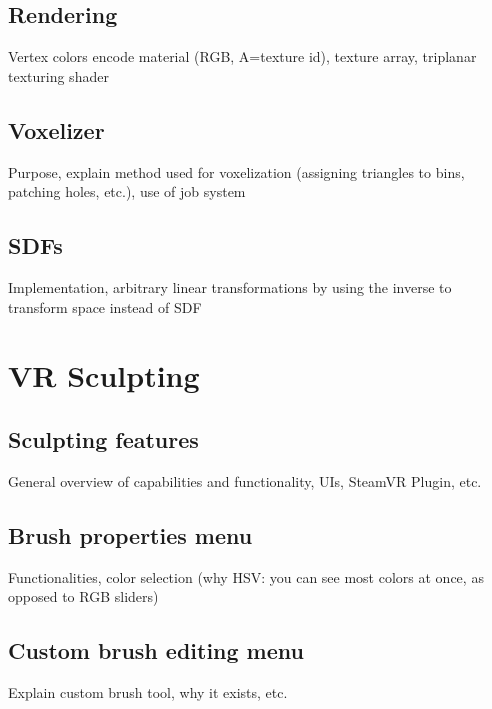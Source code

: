 \subsection{Rendering}
Vertex colors encode material (RGB, A=texture id), texture array, triplanar texturing shader

\subsection{Voxelizer}
Purpose, explain method used for voxelization (assigning triangles to bins, patching holes, etc.), use of job system

\subsection{SDFs}
Implementation, arbitrary linear transformations by using the inverse to transform space instead of SDF

\section{VR Sculpting}

\subsection{Sculpting features}
General overview of capabilities and functionality, UIs, SteamVR Plugin, etc.

\subsection{Brush properties menu}
Functionalities, color selection (why HSV: you can see most colors at once, as opposed to RGB sliders)

\subsection{Custom brush editing menu}
Explain custom brush tool, why it exists, etc.